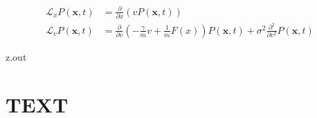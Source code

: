 \begin{align*}
\mathcal{L}_{x}P(\bm{x},t) &= \frac{\partial}{\partial x}\left(vP(\bm{x},t)\right)\\
\mathcal{L}_{v}P(\bm{x},t) &= \frac{\partial}{\partial v}\left(-\frac{\gamma}{m}v + \frac{1}{m}F(x)\right)P(\bm{x},t) + \sigma^{2}\frac{\partial^{2}}{\partial v^{2}}P(\bm{x},t)
\end{align*}


\begin{VerbatimOut}{z.out}
\chapter{TEXT}

\end{VerbatimOut}

\MyIO

